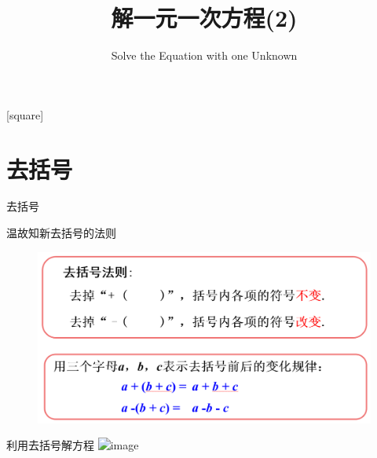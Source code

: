 
\usepackage{smartdiagram}
[square]


\title{解一元一次方程(2)}
\subtitle{Solve the Equation with one Unknown}



\frame{\titlepage}
    
\section{去括号}
\begin{frame}{去括号}
\end{frame}

\begin{frame}{温故知新}{去括号的法则}
    \begin{figure}
        \includegraphics[width=.9\textwidth]{assets/11.png}
    \end{figure}
\end{frame}

\begin{frame}{利用去括号解方程}
    \includegraphics<2>[width=.7\textwidth]{assets/12.png}
\end{frame}

